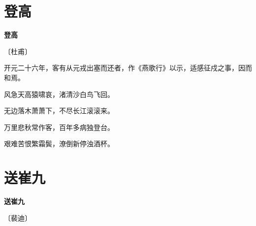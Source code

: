 \documentclass[12pt,UTF-8,openany,fontset=none]{ctexbook}
\begin{document}
\vspace{8pt}
\clearpage

\section{登高}


\begin{center}
    {\bfseries 登高}

    \vspace{18pt}

    \begin{large}\xuwen
        〔杜甫〕
    \end{large}

\end{center}

    \vspace{12pt}\mbox{}

    \begin{large}\xuwen
        开元二十六年，客有从元戎出塞而还者，作《燕歌行》以示，适感征戍之事，因而和焉。
    \end{large}


    \vspace{8pt}

\begin{center}
    \begin{Large}

        风急天高猿啸哀，渚清沙白鸟飞回。

        无边落木萧萧下，不尽长江滚滚来。

        万里悲秋常作客，百年多病独登台。

        艰难苦恨繁霜鬓，潦倒新停浊酒杯。

    \end{Large}

\end{center}

\vspace{8pt}
\clearpage

\section{送崔九}


\begin{center}
    {\bfseries 送崔九}

    \vspace{18pt}

    \begin{large}\xuwen
        〔裴迪〕
    \end{large}

\end{center}
\end{document}
